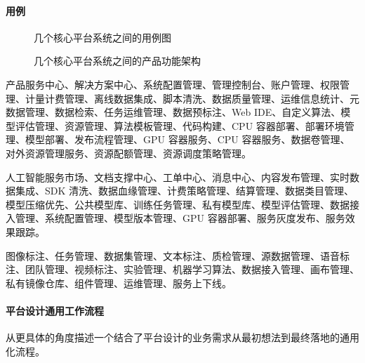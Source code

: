 \documentclass[letterpaper,11pt,english]{sphinxmanual}
\begin{document}


\paragraph{用例}
\label{\detokenize{chapter_introduction/platform:id7}}
\begin{figure}[H]
\centering
\capstart

\noindent{}
\caption{几个核心平台系统之间的用例图\sphinxfootnotemark[103]}\label{\detokenize{chapter_introduction/platform:id13}}\end{figure}
%
\begin{footnotetext}[103]\sphinxAtStartFootnote
{}
%
\end{footnotetext}\ignorespaces 
\begin{figure}[H]
\centering
\capstart

\noindent{}
\caption{几个核心平台系统之间的产品功能架构}\label{\detokenize{chapter_introduction/platform:id14}}\end{figure}


产品服务中心、解决方案中心、系统配置管理、管理控制台、账户管理、权限管理、计量计费管理、离线数据集成、脚本清洗、数据质量管理、运维信息统计、元数据管理、数据检索、任务运维管理、数据预标注、Web
IDE、自定义算法、模型评估管理、资源管理、算法模板管理、代码构建、CPU
容器部署、部署环境管理、模型部署、发布流程管理、GPU 容器服务、CPU
容器服务、数据卷管理、对外资源管理服务、资源配额管理、资源调度策略管理。


人工智能服务市场、文档支撑中心、工单中心、消息中心、内容发布管理、实时数据集成、SDK
清洗、数据血缘管理、计费策略管理、结算管理、数据类目管理、模型压缩优先、公共模型库、训练任务管理、私有模型库、模型评估管理、数据接入管理、系统配置管理、模型版本管理、GPU
容器部署、服务灰度发布、服务效果跟踪。


图像标注、任务管理、数据集管理、文本标注、质检管理、源数据管理、语音标注、团队管理、视频标注、实验管理、机器学习算法、数据接入管理、画布管理、私有镜像仓库、组件管理、运维管理、服务上下线。


\paragraph{平台设计通用工作流程}
\label{\detokenize{chapter_introduction/platform:id8}}
从更具体的角度描述一个结合了平台设计的业务需求从最初想法到最终落地的通用化流程。
%
\begin{footnote}[104]\sphinxAtStartFootnote
{}
%
\end{footnote}
\end{document}
